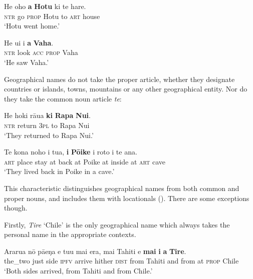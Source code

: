 \ea\label{ex:3.65}
\gll He oho \textbf{a} \textbf{Hotu} ki te hare. \\
\textsc{ntr} go \textsc{prop} Hotu to \textsc{art} house \\

\glt 
‘Hotu went home.’ \textstyleExampleref{[R273.003]} 
\z

\ea\label{ex:3.66}
\gll He u{\ꞌ}i i \textbf{a} \textbf{Vaha}. \\
\textsc{ntr} look \textsc{acc} \textsc{prop} Vaha \\

\glt
‘He saw Vaha.’ \textstyleExampleref{[Mtx-3-01.144]}
\z

Geographical names do not take the proper article, whether they designate countries or islands, towns, mountains or any other geographical entity. Nor do they take the common noun article \textit{te}:

\ea\label{ex:3.67}
\gll He hoki rāua \textbf{ki} \textbf{Rapa} \textbf{Nui}. \\
\textsc{ntr} return \textsc{3pl} to Rapa Nui \\

\glt 
‘They returned to Rapa Nui.’ \textstyleExampleref{[Notes]}
\z

\ea\label{ex:3.68}
\gll Te kona noho {\ꞌ}i tu{\ꞌ}a, \textbf{{\ꞌ}i} \textbf{Pōike} {\ꞌ}i roto i te {\ꞌ}ana. \\
\textsc{art} place stay at back at Poike at inside at \textsc{art} cave \\

\glt
‘They lived back in Poike in a cave.’ \textstyleExampleref{[Ley-5-26b.003]}
\z

This characteristic distinguishes geographical names from both common and proper nouns, and includes them with locationals (). There are some exceptions though.

Firstly, \textit{Tire} ‘Chile’ is the only geographical name which always takes the personal name in the appropriate contexts.

\ea\label{ex:3.69}
\gll Ararua nō pā{\ꞌ}eŋa e tu{\ꞌ}u mai era, mai Tahiti {\ꞌ}e \textbf{mai} \textbf{i} \textbf{a} \textbf{Tire}. \\
the\_two just side \textsc{ipfv} arrive hither \textsc{dist} from Tahiti and from at \textsc{prop} Chile \\

\glt
‘Both sides arrived, from Tahiti and from Chile.’ \textstyleExampleref{[R539-2.221]}
\z

